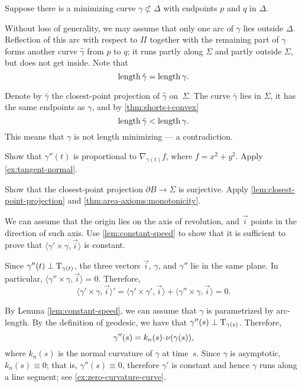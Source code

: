 \begin{multicols}{2}
Suppose there is a minimizing curve $\gamma\not\subset\Delta$ with endpoints $p$ and $q$ in $\Delta$.

Without loss of generality, we may assume that only one arc of $\gamma$ lies outside $\Delta$.
Reflection of this arc with respect to $\Pi$ together with the remaining part of $\gamma$ forms another curve $\hat\gamma$ from $p$ to $q$;
it runs partly along $\Sigma$ 
and partly outside $\Sigma$,
but does not get inside.
Note that
\[\mathop{\rm length}\nolimits\hat\gamma=\mathop{\rm length}\nolimits\gamma.\]


Denote by $\bar\gamma$ the closest-point projection of $\hat\gamma$ on~$\Sigma$.
The curve $\bar\gamma$ lies in $\Sigma$, 
it has the same endpoints as $\gamma$,
and by \ref{thm:shorts+convex}
\[\mathop{\rm length}\nolimits\bar\gamma<\mathop{\rm length}\nolimits\gamma.\]
This means that $\gamma$ is not length minimizing --- 
a contradiction.

 Show that $\gamma''(t)$ is proportional to $\nabla_{\gamma(t)} f$, where $f=x^2+y^2$. 
Apply \ref{ex:tangent-normal}.

Show that the closest-point projection $\partial B\to\Sigma$ is surjective.
Apply \ref{lem:closest-point-projection} and \ref{thm:area-axioms:monotonicity}.


\setcounter{eqtn}{0}


We can assume that the origin lies on the axis of revolution, and $\vec i$ points in the direction of such axis.
Use \ref{lem:constant-speed} to show that it is sufficient to prove that 
$\langle\gamma'\times \gamma,\vec i\rangle$
is constant.

Since $\gamma''(t)\perp\mathrm{T}_{\gamma(t)}$, the three vectors $\vec i$, $\gamma$, and $\gamma''$ lie in the same plane.
In particular, $\langle\gamma''\times \gamma,\vec i\rangle=0$.
Therefore,
\[
\langle\gamma'\times \gamma,\vec i\rangle'
=
\langle\gamma'\times \gamma',\vec i\rangle+\langle\gamma''\times \gamma,\vec i\rangle =0
.\]



 By Lemma \ref{lem:constant-speed},
we can assume that $\gamma$ is parametrized by arc-length.
By the definition of geodesic, we have that $\gamma''(s)\perp\mathrm{T}_{\gamma(s)}$. 
Therefore, 
\[\gamma''(s)=k_n(s)\cdot\Norm(\gamma(s)),\]
where $k_n(s)$ is the normal curvature of $\gamma$ at time~$s$.
Since $\gamma$ is asymptotic, $k_n(s)\equiv 0$;
that is, $\gamma''(s)\equiv 0$, therefore $\gamma'$ is constant and hence $\gamma$ runs along a line segment; see \ref{ex:zero-curvature-curve}.





\end{multicols}
